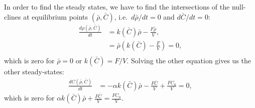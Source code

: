 In order to find the steady states, we have to find the intersections of the null-clines at equilibrium points $(\bar{\rho}, \bar{C})$, i.e.\ $d\bar{\rho}/dt = 0$ and $d\bar{C}/dt = 0$:
\begin{align*}
  \frac{d\rho(\bar{\rho}, \bar{C})}{dt} &= k(\bar{C}) \bar{\rho} - \frac{F\bar{\rho}}{V}, \\
  &= \bar{\rho} \left( k(\bar{C}) - \frac{F}{V} \right) = 0, \\
\end{align*}
which is zero for $\bar{\rho} = 0$ or $k(\bar{C}) = F/V$.  Solving the other equation gives us the other steady-states:
\begin{align*}
  \frac{dC(\bar{\rho}, \bar{C})}{dt} &= -\alpha k(\bar{C}) \bar{\rho} - \frac{F\bar{C}}{V} + \frac{FC_0}{V} = 0,
\end{align*}
which is zero for $\alpha k(\bar{C}) \bar{\rho} + \frac{F\bar{C}}{V} = \frac{FC_0}{V}$.

